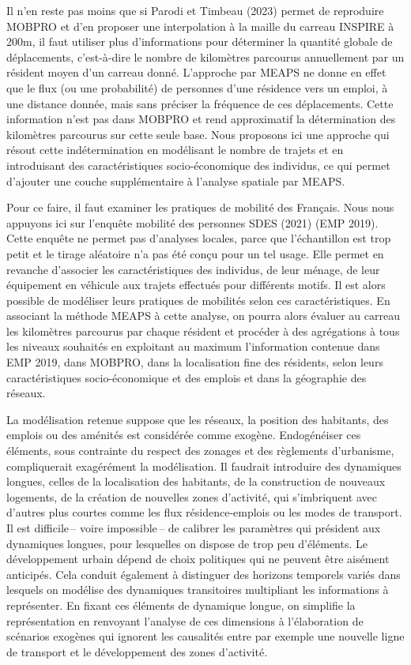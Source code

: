\documentclass[
  9pt,
  a4paper,
  DIV=11]{scrreprt}
\begin{document}
Il n'en reste pas moins que si Parodi et Timbeau (2023) permet de
reproduire MOBPRO et d'en proposer une interpolation à la maille du
carreau INSPIRE à 200m, il faut utiliser plus d'informations pour
déterminer la quantité globale de déplacements, c'est-à-dire le nombre
de kilomètres parcourus annuellement par un résident moyen d'un carreau
donné. L'approche par MEAPS ne donne en effet que le flux (ou une
probabilité) de personnes d'une résidence vers un emploi, à une distance
donnée, mais sans préciser la fréquence de ces déplacements. Cette
information n'est pas dans MOBPRO et rend approximatif la détermination
des kilomètres parcourus sur cette seule base. Nous proposons ici une
approche qui résout cette indétermination en modélisant le nombre de
trajets et en introduisant des caractéristiques socio-économique des
individus, ce qui permet d'ajouter une couche supplémentaire à l'analyse
spatiale par MEAPS.

Pour ce faire, il faut examiner les pratiques de mobilité des Français.
Nous nous appuyons ici sur l'enquête mobilité des personnes SDES (2021)
(EMP 2019). Cette enquête ne permet pas d'analyses locales, parce que
l'échantillon est trop petit et le tirage aléatoire n'a pas été conçu
pour un tel usage. Elle permet en revanche d'associer les
caractéristiques des individus, de leur ménage, de leur équipement en
véhicule aux trajets effectués pour différents motifs. Il est alors
possible de modéliser leurs pratiques de mobilités selon ces
caractéristiques. En associant la méthode MEAPS à cette analyse, on
pourra alors évaluer au carreau les kilomètres parcourus par chaque
résident et procéder à des agrégations à tous les niveaux souhaités en
exploitant au maximum l'information contenue dans EMP 2019, dans MOBPRO,
dans la localisation fine des résidents, selon leurs caractéristiques
socio-économique et des emplois et dans la géographie des réseaux.

La modélisation retenue suppose que les réseaux, la position des
habitants, des emplois ou des aménités est considérée comme exogène.
Endogénéiser ces éléments, sous contrainte du respect des zonages et des
règlements d'urbanisme, compliquerait exagérément la modélisation. Il
faudrait introduire des dynamiques longues, celles de la localisation
des habitants, de la construction de nouveaux logements, de la création
de nouvelles zones d'activité, qui s'imbriquent avec d'autres plus
courtes comme les flux résidence-emplois ou les modes de transport. Il
est difficile\,-- voire impossible\,-- de calibrer les paramètres qui
président aux dynamiques longues, pour lesquelles on dispose de trop peu
d'éléments. Le développement urbain dépend de choix politiques qui ne
peuvent être aisément anticipés. Cela conduit également à distinguer des
horizons temporels variés dans lesquels on modélise des dynamiques
transitoires multipliant les informations à représenter. En fixant ces
éléments de dynamique longue, on simplifie la représentation en
renvoyant l'analyse de ces dimensions à l'élaboration de scénarios
exogènes qui ignorent les causalités entre par exemple une nouvelle
ligne de transport et le développement des zones d'activité.
\end{document}
